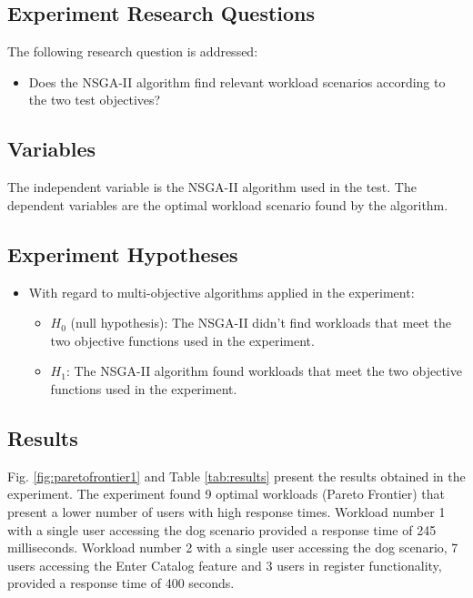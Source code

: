\documentclass[espaco=umemeio,chapter=TITLE,twoside,openright]{abnt}
\begin{document}
\subsection{Experiment Research Questions}

The following research question is addressed:
\begin{itemize}
\item Does the NSGA-II algorithm find relevant workload scenarios according to the two test objectives?
\end{itemize}

\subsection{Variables}

The independent variable is the NSGA-II algorithm used in the test. The dependent variables are the optimal workload scenario found by the algorithm.

\subsection{Experiment Hypotheses}

\begin{itemize}
\item With regard to multi-objective algorithms applied in the experiment:
\begin{itemize}
\item $H_{0}$ (null hypothesis): The NSGA-II didn't find workloads that meet the two objective functions used in the experiment.
\item $H_{1}$: The NSGA-II  algorithm found workloads that meet the two objective functions used in the experiment.
\end{itemize}
\end{itemize}


\subsection{Results}

Fig. \ref{fig:paretofrontier1} and Table \ref{tab:results} present the results obtained in the experiment. The experiment found 9 optimal workloads (Pareto Frontier) that present a lower number of users with high response times. Workload number 1 with a single user accessing the dog scenario provided a response time of 245 milliseconds.  Workload number 2 with a single user accessing the dog scenario, 7 users accessing the Enter Catalog feature and 3 users in register functionality, provided a response time of 400 seconds.
\end{document}

